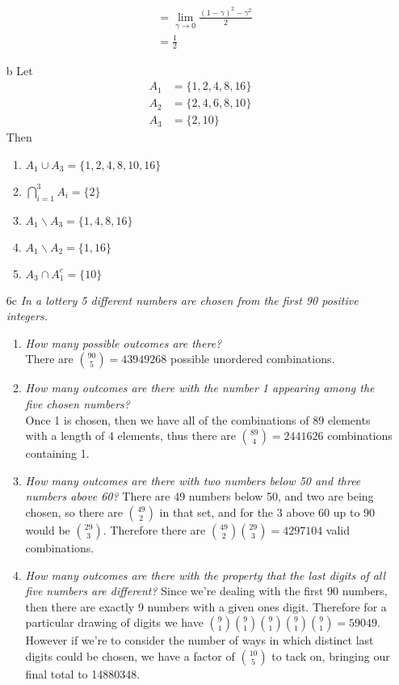 \documentclass[12pt, letterpaper]{article}
\begin{document}
\begin{enumerate}
\begin{align*}
			 &= \lim_{\gamma \to 0} \frac{(1-\gamma)^2 - \gamma^2}{2}\\
			 &= \frac{1}{2}
		\end{align*}
	\item[b]
	Let \begin{align*}
	A_1 &= \{1, 2, 4, 8, 16\}\\
	A_2 &= \{2, 4, 6, 8, 10\}\\
	A_3 &= \{2, 10\}
	\end{align*}
	Then
	\begin{enumerate}
		\item $A_1 \cup A_3 = \{1, 2, 4, 8, 10, 16\}$
		\item $\bigcap_{i=1}^3 A_i = \{2\}$
		\item $A_1 \backslash A_3 = \{1, 4, 8, 16\}$
		\item $A_1 \backslash A_2 = \{1,16\}$
		\item $A_3 \cap A_1^c = \{10\}$
	\end{enumerate}
	\item[6c]
	\textit{In a lottery 5 different numbers are chosen from the first 90
positive integers.}
	\begin{enumerate}
		\item \textit{How many possible outcomes are there?}\\
		There are $\binom{90}{5} = 43949268$ possible unordered combinations.  
		\item \textit{How many outcomes are there with the number 1 appearing among the
five chosen numbers?}\\
	   Once 1 is chosen, then we have all of the combinations of 89 elements with a length of 4 elements, thus there are $\binom{89}{4} = 2441626$ combinations containing 1.
	   \item \textit{How many outcomes are there with two numbers below 50 and three
numbers above 60?}
		There are 49 numbers below 50, and two are being chosen, so there are $\binom{49}{2}$ in that set, and for the 3 above 60 up to 90 would be $\binom{29}{3}$.  Therefore there are $\binom{49}{2}\binom{29}{3} = 4297104$ valid combinations.  
	   \item \textit{How many outcomes are there with the property that the last digits of all
five numbers are different?}
	     Since we're dealing with the first 90 numbers, then there are exactly 
	     9 numbers with a given ones digit.   Therefore for a particular drawing of digits we have $\binom{9}{1}\binom{9}{1}\binom{9}{1}\binom{9}{1}\binom{9}{1} = 59049$.  However if we're to consider the number of ways in which distinct last digits could be chosen, we have a factor of $\binom{10}{5}$ to tack on, bringing our final total to 14880348.   
	\end{enumerate}
\end{enumerate}
\end{document}
